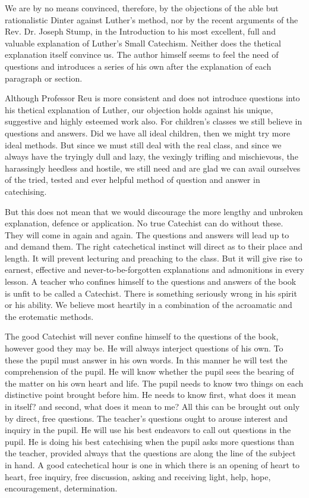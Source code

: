 We are by no means convinced, therefore, by the objections of the able but rationalistic Dinter against Luther’s method, nor by the recent arguments of the Rev. Dr. Joseph Stump, in the Introduction to his most excellent, full and valuable explanation of Luther’s Small Catechism. Neither does the thetical explanation itself convince us.  The author himself seems to feel the need of questions and introduces a series of his own after the explanation of each paragraph or section.

Although Professor Reu is more consistent and does not introduce questions into his thetical explanation of Luther, our objection holds against his unique, suggestive and highly esteemed work also. For children’s classes we still believe in questions and answers. Did we have all ideal children, then we might try more ideal methods. But since we must still deal with the real class, and since we always have the tryingly dull and lazy, the vexingly trifling and mischievous, the harassingly heedless and hostile, we still need and are glad we can avail ourselves of the tried, tested and ever helpful method of question and answer in catechising.

But this does not mean that we would discourage the more lengthy and unbroken explanation, defence
or application. No true Catechist can do without these. They will come in again and again. The questions and answers will lead up to and demand them.  The right catechetical instinct will direct as to their place and length. It will prevent lecturing and preaching to the class. But it will give rise to earnest, effective and never-to-be-forgotten explanations and admonitions in every lesson. A teacher who confines himself to the questions and answers of the book is unfit to be called a Catechist. There is something seriously wrong in his spirit or his ability. We believe most heartily in a combination of the acroamatic and the erotematic methods.

The good Catechist will never confine himself to the questions of the book, however good they may be. He will always interject questions of his own.  To these the pupil must answer in his own words. In this manner he will test the comprehension of the pupil. He will know whether the pupil sees the bearing of the matter on his own heart and life. The pupil needs to know two things on each distinctive point brought before him. He needs to know first, what does it mean in itself? and second, what does it mean to me? All this can be brought out only by direct, free questions. The teacher’s questions ought to arouse interest and inquiry in the pupil. He will use his best endeavors
to call out questions in the pupil. He is doing his best catechising when the pupil asks more questions than the teacher, provided always that the questions are along the line of the subject in hand. A good catechetical hour is one in which there is an opening of heart to heart, free inquiry, free discussion, asking and receiving light, help, hope, encouragement, determination.

